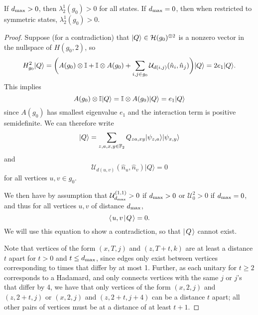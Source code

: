 \documentclass[../thesis-main/thesis-main]{subfiles}
\begin{document}
\begin{lemma}
\label{lem:2particle}If $d_{\text{max}} > 0$, then $\lambda_{2}^{1}(g_{0})>0$ for all states.  If $d_{\text{max}} = 0$, then when restricted to symmetric states, $\lambda_2^{1}(g_0) >0$.
\end{lemma}

\begin{proof}
Suppose (for a contradiction) that $|Q\rangle\in \mathcal{H}(g_0)^{\otimes 2}$ is a nonzero vector in the nullspace of $H(g_{0},2)$, so 
\begin{equation}
  H_{g_{0}}^{2}|Q\rangle
    =\bigg(A(g_{0})\otimes\mathbb{I}+\mathbb{I}\otimes A(g_{0})+\sum_{i,j \in g_{0}}\mathcal{U}_{d(i,j)}(\hat{n}_i,\hat{n}_j)\bigg)|Q\rangle=2e_{1}|Q\rangle.
\end{equation}
This implies 
\begin{equation}
  A(g_{0})\otimes\mathbb{I}|Q\rangle=\mathbb{I}\otimes A(g_{0})|Q\rangle=e_{1}|Q\rangle
\end{equation}
since $A(g_0)$ has smallest eigenvalue $e_1$ and the interaction term is positive semidefinite. We can therefore write 
\begin{equation}
  |Q\rangle=\sum_{z,a,x,y\in \mathbb{F}_2}Q_{za,xy}|\psi_{z,a}\rangle|\psi_{x,y}\rangle
\end{equation}
and 
\begin{equation}
  \mathcal{U}_{d(u,v)}(\hat{n}_u,\hat{n}_v)|Q\rangle=0
\end{equation}
for all vertices $u,v\in g_{0}.$ 


We then have by assumption that  $\mathcal{U}^{(1,1)}_{d_{\text{max}}} >  0$ if $d_{\text{max}} > 0$ or $\mathcal{U}^{2}_{0} > 0$ if $d_{\text{max}} = 0$,  and thus for all vertices $u,v$ of distance $d_{\text{max}}$, 
\begin{equation}
  \langle\mspace{2mu} u,v \mspace{2mu} | \mspace{2mu} Q\mspace{2mu} \rangle = 0\label{eq:dmin_annihilate}.
\end{equation}
We will use this equation to show a contradiction, so that $|\mspace{2mu} Q \mspace{2mu} \rangle$ cannot exist.

Note that vertices of the form $(x,T,j)$ and $(z,T+t,k)$ are at least a distance $t$ apart for $t>0$ and $t\leq d_{\text{max}}$, since edges only exist between vertices corresponding to times that differ by at most 1.  Further, as each unitary for $t\geq 2$ corresponds to a Hadamard, and only connects vertices with the same $j$ or $j$'s that differ by 4, we have that only vertices of the form $(x,2,j)$ and $(z,2+t,j)$ or $(x,2,j)$ and $(z,2+t,j+4)$ can be a distance $t$ apart; all other pairs of vertices must be at a distance of at least $t+1$.


\end{proof}
\end{document}
